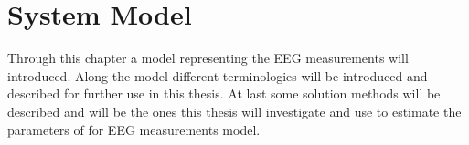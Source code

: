 \chapter{System Model}\label{ch:system_model}
Through this chapter a model representing the EEG measurements will introduced. Along the model different terminologies will be introduced and described for further use in this thesis. At last some solution methods will be described and will be the ones this thesis will investigate and use to estimate the parameters of for EEG measurements model.
    

